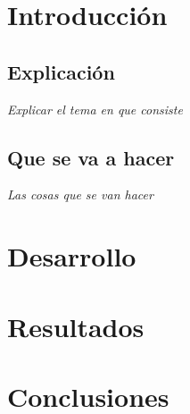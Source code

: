 \documentclass[11pt,a4paper,twoside]{tesis}
\begin{document}
\def\titulo{Licenciada }

\def\autor{Amit Stein}
\def\autor{Juan Andres Knebel}
\def\tituloTesis{Composite Retrival: \mbox{Algo}}
\def\runtitulo{Composite Retrival en español}
\def\runtitle{Composite Retrival en ingles}
\def\director{Obi-Wan Kenobi}
\def\codirector{Master Yoda}
\def\lugar{Buenos Aires, 2014}


\frontmatter
\pagestyle{empty}


\cleardoublepage


\cleardoublepage

\cleardoublepage

\cleardoublepage
\tableofcontents

\mainmatter
\pagestyle{headings}


\chapter{Introducción}
\section{Explicación}
{\begin{small}%
\begin{flushright}%
\it
Explicar el tema en que consiste
\end{flushright}%
\end{small}%
\vspace{.5cm}}

\section{Que se va a hacer}
{\begin{small}%
\begin{flushright}%
\it
Las cosas que se van hacer
\end{flushright}%
\end{small}%
\vspace{.5cm}}

\chapter{Desarrollo}
\chapter{Resultados}
\chapter{Conclusiones}

\backmatter
%
\end{document}
